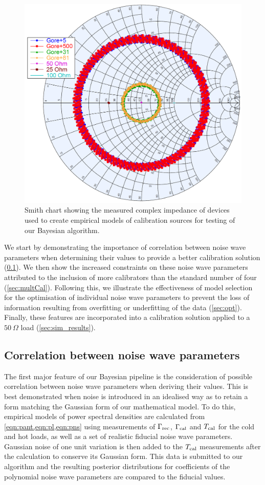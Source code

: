 \begin{figure}
    \centering
    \includegraphics[width=.5\columnwidth]{sim_data_smith}
    \caption{Smith chart showing the measured complex impedance of devices used to create empirical models of calibration sources for testing of our Bayesian algorithm.
    \label{fig:sim_data_smith}}
\end{figure}

We start by demonstrating the importance of correlation between noise wave parameters when determining their values to provide a better calibration solution (\cref{sec:correlation}). We then show the increased constraints on these noise wave parameters attributed to the inclusion of more calibrators than the standard number of four (\cref{sec:multCal}). Following this, we illustrate the effectiveness of model selection for the optimisation of individual noise wave parameters to prevent the loss of information resulting from overfitting or underfitting of the data (\cref{sec:opt}). Finally, these features are incorporated into a calibration solution applied to a $50 \ \Omega$ load (\cref{sec:sim_results}).


\subsection{Correlation between noise wave parameters}\label{sec:correlation}
The first major feature of our Bayesian pipeline is the consideration of possible correlation between noise wave parameters when deriving their values. This is best demonstrated when noise is introduced in an idealised way as to retain a form matching the Gaussian form of our mathematical model. To do this, empirical models of power spectral densities are calculated from \cref{eqn:pant,eqn:pl,eqn:pns} using measurements of $\Gamma_{\mathrm{rec}}$, $\Gamma_{\mathrm{cal}}$ and $T_{\mathrm{cal}}$ for the cold and hot loads, as well as a set of realistic fiducial noise wave parameters. Gaussian noise of one unit variation is then added to the $T_{\mathrm{cal}}$ measurements after the calculation to conserve its Gaussian form. This data is submitted to our algorithm and the resulting posterior distributions for coefficients of the polynomial noise wave parameters are compared to the fiducial values.

